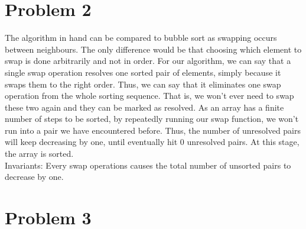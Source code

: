 \documentclass[12pt,letterpaper]{article}
\begin{document}
\section*{Problem 2}
The algorithm in hand can be compared to bubble sort as swapping occurs between neighbours.
The only difference would be that choosing which element to swap is done arbitrarily and not in order.
For our algorithm, we can say that a single swap operation resolves one sorted pair of elements,
simply because it swaps them to the right order.
Thus, we can say that it eliminates one swap operation from the whole sorting sequence.
That is, we won't ever need to swap these two again and they can be marked as resolved.
As an array has a finite number of steps to be sorted, by repeatedly running our swap function, 
we won't run into a pair we have encountered before.
Thus, the number of unresolved pairs will keep decreasing by one, until eventually hit 0 unresolved pairs.
At this stage, the array is sorted. \\

Invariants: Every swap operations causes the total number of unsorted pairs to decrease by one.

\newpage

\section*{Problem 3}
\end{document}
